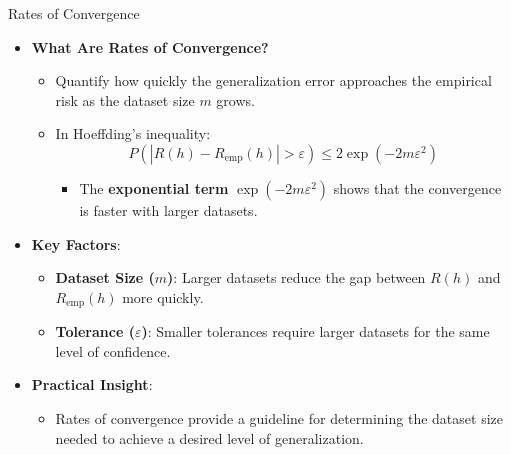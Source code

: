 \documentclass[
  ignorenonframetext,
]{beamer}
\providecommand{\tightlist}{%
  \setlength{\itemsep}{0pt}\setlength{\parskip}{0pt}}\usepackage{longtable,booktabs,array}
\begin{document}
\begin{frame}{Rates of Convergence}
\label{rates-of-convergence}
\begin{itemize}
\tightlist
\item
  \textbf{What Are Rates of Convergence?}

  \begin{itemize}
  \tightlist
  \item
    Quantify how quickly the generalization error approaches the
    empirical risk as the dataset size \(m\) grows.
  \item
    In Hoeffding's inequality: \[
    P(|R(h) - R_{\text{emp}}(h)| > \varepsilon) \leq 2 \exp(-2m\varepsilon^2)
    \]

    \begin{itemize}
    \tightlist
    \item
      The \textbf{exponential term} \(\exp(-2m\varepsilon^2)\) shows
      that the convergence is faster with larger datasets.
    \end{itemize}
  \end{itemize}
\item
  \textbf{Key Factors}:

  \begin{itemize}
  \tightlist
  \item
    \textbf{Dataset Size (\(m\))}: Larger datasets reduce the gap
    between \(R(h)\) and \(R_{\text{emp}}(h)\) more quickly.
  \item
    \textbf{Tolerance (\(\varepsilon\))}: Smaller tolerances require
    larger datasets for the same level of confidence.
  \end{itemize}
\item
  \textbf{Practical Insight}:

  \begin{itemize}
  \tightlist
  \item
    Rates of convergence provide a guideline for determining the dataset
    size needed to achieve a desired level of generalization.
  \end{itemize}
\end{itemize}
\end{frame}
\end{document}
